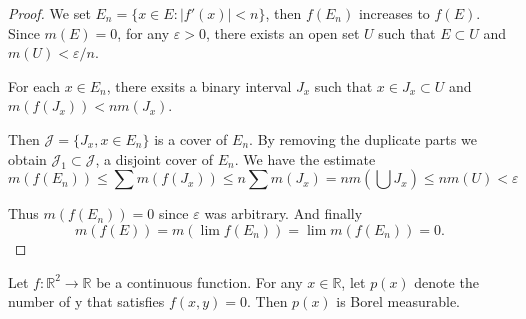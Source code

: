 \begin{proof}
	We set $ E_{n}=\{x\in E\colon|f'(x)|<n\} $, then $ f(E_{n}) $ increases to $ f(E) $. Since $ m(E)=0 $, for any $ \varepsilon>0 $,
	there exists an open set $ U $ such that $ E\subset U $ and $ m(U)<\varepsilon/n $.

	For each $ x\in E_{n} $, there exsits a binary interval $ J_{x} $ such that $ x\in J_{x}\subset U $ and $ m(f(J_{x}))<nm(J_{x}) $.

	Then $ \mathcal{J} =\{J_{x},x\in E_{n}\} $ is a cover of $ E_{n} $.
	By removing the duplicate parts we obtain $ \mathcal{J} _{1}\subset \mathcal{J}  $, a disjoint cover of $ E_{n} $.
	We have the estimate
	$$ m(f(E_{n}))\le\sum m(f(J_{x}))\le n\sum m(J_{x}) = nm\left (\bigcup J_{x}\right )\le nm(U)<\varepsilon  $$

	Thus $ m(f(E_{n}))=0 $ since $ \varepsilon $ was arbitrary. And finally
	$$
		m( f( E ) ) =m( \lim f( E_n ) ) =\lim m( f( E_n ) ) =0.
	$$


\end{proof}

\begin{problem}
Let $ f\colon \mathbb{R}^{2} \to \mathbb{R}  $ be a continuous function.
For any $ x\in \mathbb{R}  $, let $ p(x) $ denote the number of y that satisfies $ f(x,y)=0 $.
Then $ p(x) $ is Borel measurable.
\end{problem}

